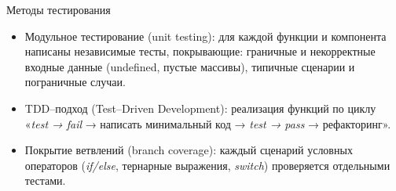 \documentclass[aspectratio=169]{beamer}
\begin{document}
\begin{frame}{Методы тестирования}
\small
\justifying

\begin{itemize}
  \item Модульное тестирование (unit testing):
    для каждой функции и компонента написаны независимые тесты, покрывающие:
    граничные и некорректные входные данные (undefined, пустые массивы), типичные сценарии и пограничные случаи.
  \item TDD–подход (Test–Driven Development):
    реализация функций по циклу «\textit{test → fail} → написать минимальный код → \textit{test → pass} → рефакторинг».
  \item Покрытие ветвлений (branch coverage):
    каждый сценарий условных операторов (\textit{if/else}, тернарные выражения, \textit{switch}) проверяется отдельными тестами.
\end{itemize}
\end{frame}
\end{document}
